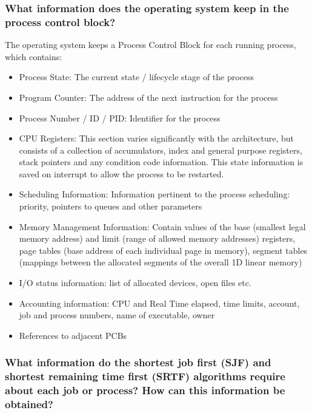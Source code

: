 \documentclass[]{article}
\begin{document}
        \newpage
        \subsubsection{What information does the operating system keep in the process control block?}

        The operating system keeps a Process Control Block for each running process, which contains:

            \begin{itemize}
                \item Process State: The current state / lifecycle stage of the process
                \item Program Counter: The address of the next instruction for the process
                \item Process Number / ID / PID: Identifier for the process
                \item CPU Registers: This section varies significantly with the architecture, but consists of a collection of accumulators, index and general purpose registers, stack pointers and any condition code information. This state information is saved on interrupt to allow the process to be restarted.
                \item Scheduling Information: Information pertinent to the process scheduling: priority, pointers to queues and other parameters
                \item Memory Management Information: Contain values of the base (smallest legal memory address) and limit (range of allowed memory addresses) registers, page tables (base address of each individual page in memory), segment tables (mappings between the allocated segments of the overall 1D linear memory)
                \item I/O status information: list of allocated devices, open files etc.
                \item Accounting information: CPU and Real Time elapsed, time limits, account, job and process numbers, name of executable, owner
                \item References to adjacent PCBs
            \end{itemize}

        \subsubsection{What information do the shortest job first (SJF) and shortest remaining time first (SRTF) algorithms require about each job or process? How can this information be obtained?}
\end{document}
